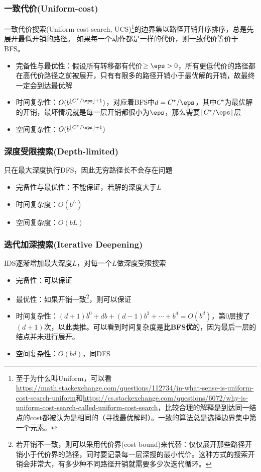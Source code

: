 \subsubsection{一致代价(Uniform-cost)}
一致代价搜索(Uniform cost search, UCS)\footnote{至于为什么叫Uniform，可以看\url{https://math.stackexchange.com/questions/112734/in-what-sense-is-uniform-cost-search-uniform}和\url{https://cs.stackexchange.com/questions/6072/why-is-uniform-cost-search-called-uniform-cost-search}，比较合理的解释是到达同一结点的cost都被认为是相同的（寻找最优解时）。一致的算法总是选择边界集中第一个元素。}的边界集以路径开销升序排序，总是先展开最低开销的路径。
如果每一个动作都是一样的代价，则一致代价等价于BFS。
\begin{itemize}
	\item 完备性与最优性：假设所有转移都有代价$\geq\eps>0$，所有更低代价的路径都在高代价路径之前被展开，只有有限多的路径开销小于最优解的开销，故最终一定会到达最优解
	\item 时间复杂性：$O(b^{\lfloor C^\star/\eps\rfloor+1})$，对应着BFS中$d=C^\star/\eps$，其中$C^\star$为最优解的开销，最坏情况就是每一层开销都很小为$\eps$，那么需要$\lfloor C^\star/\eps\rfloor$层
	\item 空间复杂性：$O(b^{\lfloor C^\star/\eps\rfloor+1})$
\end{itemize}

\subsubsection{深度受限搜索(Depth-limited)}
只在最大深度执行DFS，因此无穷路径长不会存在问题
\begin{itemize}
	\item 完备性与最优性：不能保证，若解的深度大于$L$
	\item 时间复杂度：$O(b^L)$
	\item 空间复杂度：$O(bL)$
\end{itemize}

\subsubsection{迭代加深搜索(Iterative Deepening)}
IDS逐渐增加最大深度$L$，对每一个$L$做深度受限搜索
\begin{itemize}
	\item 完备性：可以保证
	\item 最优性：如果开销一致\footnote{若开销不一致，则可以采用代价界(cost bound)来代替：仅仅展开那些路径开销小于代价界的路径，同时要记录每一层深搜的最小代价。这种方式的搜索开销会非常大，有多少种不同路径开销就需要多少次迭代循环。}，则可以保证
	\item 时间复杂性：$(d+1)b^0+db+(d-1)b^2+\cdots+b^d=O(b^d)$，第$0$层搜了$(d+1)$次，以此类推。可以看到时间复杂度是\textbf{比BFS优}的，因为最后一层的结点并未进行展开。
	\item 空间复杂性：$O(bd)$，同DFS
\end{itemize}


